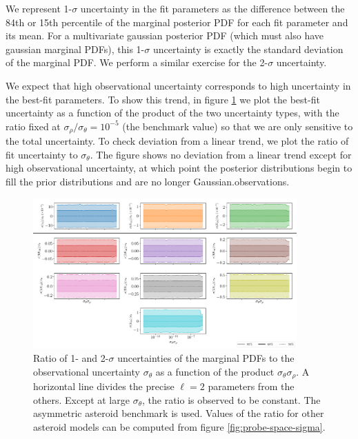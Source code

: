 \documentclass{aastex631}
\begin{document}
We represent 1-$\sigma$ uncertainty in the fit parameters as the difference between the 84th or 15th percentile of the marginal posterior PDF for each fit parameter and its mean. For a multivariate gaussian posterior PDF (which must also have gaussian marginal PDFs), this 1-$\sigma$ uncertainty is exactly the standard deviation of the marginal PDF. We perform a similar exercise for the 2-$\sigma$ uncertainty.

We expect that high observational uncertainty corresponds to high uncertainty in the best-fit parameters. To show this trend, in figure \ref{fig:probe-sigma-product} we plot the best-fit uncertainty as a function of the product of the two uncertainty types, with the ratio fixed at $\sigma_\rho / \sigma_\theta = 10^{-5}$ (the benchmark value) so that we are only sensitive to the total uncertainty. To check deviation from a linear trend, we plot the ratio of fit uncertainty to $\sigma_\theta$. The figure shows no deviation from a linear trend except for high observational uncertainty, at which point the posterior distributions begin to fill the prior distributions and are no longer Gaussian.observations.

\begin{figure}
  \centering
  \includegraphics[width=0.9\textwidth]{sigma-products.pdf}
  \caption{Ratio of 1- and 2-$\sigma$ uncertainties of the marginal PDFs to the observational uncertainty $\sigma_\theta$ as a function of the product $\sigma_\theta\sigma_\rho$. A horizontal line divides the precise $\ell=2$ parameters from the others. Except at large $\sigma_\theta$, the ratio is observed to be constant. The asymmetric asteroid benchmark is used. Values of the ratio for other asteroid models can be computed from figure \ref{fig:probe-space-sigma}.}
  \label{fig:probe-sigma-product}
\end{figure}
\end{document}
